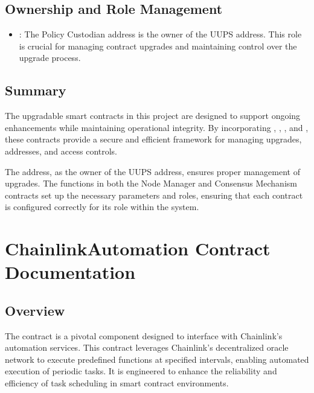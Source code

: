 \documentclass[letterpaper,10pt,english]{sphinxmanual}
\begin{document}
\section{Ownership and Role Management}
\label{\detokenize{docs_upgradable_contract:ownership-and-role-management}}
\sphinxAtStartPar
{}
\begin{itemize}
\item {} 
\sphinxAtStartPar
{}: The Policy Custodian address is the owner of the UUPS address. This role is crucial for managing contract upgrades and maintaining control over the upgrade process.

\end{itemize}


\section{Summary}
\label{\detokenize{docs_upgradable_contract:summary}}
\sphinxAtStartPar
The upgradable smart contracts in this project are designed to support ongoing enhancements while maintaining operational integrity. By incorporating , , , and , these contracts provide a secure and efficient framework for managing upgrades, addresses, and access controls.

\sphinxAtStartPar
The  address, as the owner of the UUPS address, ensures proper management of upgrades. The  functions in both the Node Manager and Consensus Mechanism contracts set up the necessary parameters and roles, ensuring that each contract is configured correctly for its role within the system.

\sphinxstepscope


\chapter{ChainlinkAutomation Contract Documentation}
\label{\detokenize{docs_chainlink_automation_contract:chainlinkautomation-contract-documentation}}\label{\detokenize{docs_chainlink_automation_contract::doc}}

\section{Overview}
\label{\detokenize{docs_chainlink_automation_contract:overview}}
\sphinxAtStartPar
The  contract is a pivotal component designed to interface with Chainlink’s automation services. This contract leverages Chainlink’s decentralized oracle network to execute predefined functions at specified intervals, enabling automated execution of periodic tasks. It is engineered to enhance the reliability and efficiency of task scheduling in smart contract environments.
\end{document}
